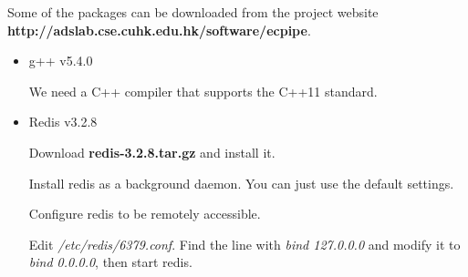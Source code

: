 \documentclass[letterpaper,12pt]{article}
\begin{document}
Some of the packages can be downloaded from the project website\\
{\bf http://adslab.cse.cuhk.edu.hk/software/ecpipe}.
%
\begin{itemize}

\item g++ v5.4.0

We need a C++ compiler that supports the C++11 standard.
%

\begin{center}
\noindent{}
\end{center}

\item Redis v3.2.8

Download {\bf redis-3.2.8.tar.gz} and install it.
%

\begin{center}
\noindent{}
\end{center}

Install redis as a background daemon. You can just use the default settings.
%

\begin{center}
\noindent{}
\end{center}

Configure redis to be remotely accessible.
%

\begin{center}
\noindent{}
\end{center}

Edit {\sl /etc/redis/6379.conf}. Find the line with {\em bind 127.0.0.0}
and modify it to {\em bind 0.0.0.0}, then start redis.

%
\begin{center}
\noindent{}
\end{center}


\end{itemize}
\end{document}
